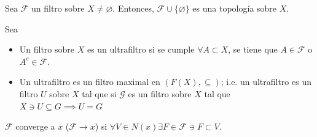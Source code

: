 \begin{cajita}
    \begin{nota}[Escolio]
        Sea $\mathcal{F}$ un filtro sobre $X\neq\varnothing$. Entonces,  $\mathcal{F}\cup \{\varnothing\}$ es una topología sobre $X$. 
    \end{nota}    
\end{cajita}

\begin{definicion}[Ultrafiltros]
    Sea 
    \begin{itemize}
        \item Un filtro sobre $X$ es un ultrafiltro  si se cumple $\forall A\subset X $, se tiene que $A\in \mathcal{F}$ o $A^c\in \mathcal{F}$.
        \item Un ultrafiltro es un filtro maximal en $(F(X), \subseteq)$; i.e. un ultrafiltro es un filtro $U$ sobre $X$ tal que si $\mathcal{G}$ es un filtro sobre $X$ tal que $X\ni U\subseteq G\implies U=G$ 
    \end{itemize}
\end{definicion}

\begin{definicion}
    $\mathcal{F}$ converge a $x$ ($\mathcal{F}\to x$) si $\forall V\in N(x)\exists F\in \mathcal{F}\ni F\subset V$. 
\end{definicion}